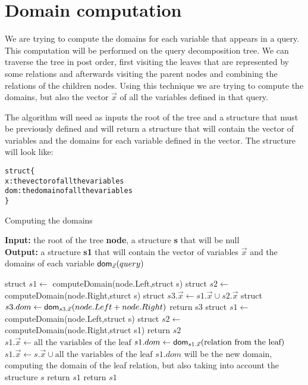 \documentclass[12pt]{article}
\begin{document}
\section{Domain computation}

We are trying to compute the domains for each variable that appears in a query. This computation will be performed on the query decomposition tree. We can traverse the tree in post order, first visiting the leaves that are represented by some relations and afterwards visiting the parent nodes and combining the relations of the children nodes. Using this technique we are trying to compute the domains, but also the vector $\vec x$ of all the variables defined in that query. 

The algorithm will need as inputs the root of the tree and a structure that must be previously defined and will return a structure that will contain the vector of variables and the domains for each variable defined in the vector. The structure will look like:

\begin{alltt}
struct\{
x: the vector of all the variables 
dom: the domain of all the variables
\}
\end{alltt}

\begin{algorithm}[H]
\caption{Computing the domains} 
\label{alg}
\textbf{Input:} the root of the tree \textbf{node}, a structure \textbf{s} that will be null \\
\textbf{Output:} a structure \textbf{s1} that will contain the vector of variables \textbf{$\vec x$} and the domains of each variable \textbf{$\textsf{dom}{}_{\vec x}(query)$}
\begin{algorithmic}[1]
\STATE struct $s1\gets$ computeDomain(node.Left,struct s)
\STATE struct $s2\gets$ computeDomain(node.Right,sturct s)
\STATE struct $s3.\vec{x}\gets s1.\vec{x} \cup s2.\vec{x}$ 
\STATE struct $s3.dom\gets \textsf{dom}{}_{s3.\vec x}(node.Left + node.Right)$
\STATE return s3
\ELSE
\STATE struct $s1 \gets$ computeDomain(node.Left,struct s)
\STATE struct $s2 \gets$ computeDomain(node.Right,struct s1)
\STATE return $s2$
\ENDIF
\ELSE
{}
\STATE $s1.\vec{x} \gets \text{all the variables of the leaf}$
\STATE $s1.dom \gets \textsf{dom}{}_{s1.\vec{x}}(\text{relation from the leaf})$
\ELSE
\STATE $s1.\vec{x}\gets s.\vec{x} \cup \text{all the variables of the leaf}$
\STATE $s1.dom$ will be the new domain, computing the domain of the leaf relation, but also taking into account the structure $s$
\STATE return $s1$
\ENDIF
\STATE return $s1$
\ENDIF
\end{algorithmic}
\end{algorithm}
\end{document}
